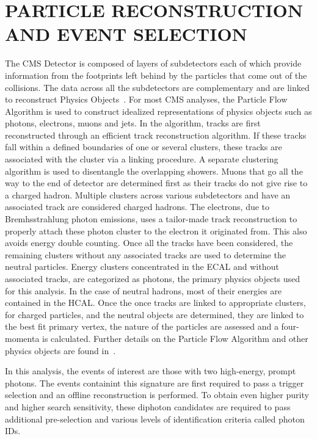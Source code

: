 \chapter{PARTICLE RECONSTRUCTION AND EVENT SELECTION}
\RaggedRight \parindent=25pt
The CMS Detector is composed of layers of subdetectors each of which provide information from the footprints left behind by the particles that come out of the collisions. The data across all the subdetectors are complementary and are linked to reconstruct Physics Objects~\cite{Beaudette:2013kbl}. For most CMS analyses, the Particle Flow Algorithm is used to construct idealized representations of physics objects such as photons, electrons, muons and jets. In the algorithm, tracks are first reconstructed through an efficient track reconstruction algorithm. If these tracks fall within a defined boundaries of one or several clusters, these tracks are associated with the cluster via a linking procedure. A separate clustering algorithm is used to disentangle the overlapping showers. Muons that go all the way to the end of detector are determined first as their tracks do not give rise to a charged hadron. Multiple clusters across various subdetectors and have an associated track are considered charged hadrons. The electrons, due to Bremhsstrahlung photon emissions, uses a tailor-made track reconstruction to properly attach these photon cluster to the electron it originated from. This also avoids energy double counting. Once all the tracks have been considered, the remaining clusters without any associated tracks are used to determine the neutral particles. Energy clusters concentrated in the ECAL and without associated tracks, are categorized as photons, the primary physics objects used for this analysis. In the case of neutral hadrons, most of their energies are contained in the HCAL. Once the once tracks are linked to appropriate clusters, for charged particles, and the neutral objects are determined, they are linked to the best fit primary vertex, the nature of the particles are assessed and a four-momenta is calculated. Further details on the Particle Flow Algorithm and other physics objects are found in~\cite{CMS-PRF-14-001}.

In this analysis, the events of interest are those with two high-energy, prompt photons. The events containint this signature are first required to pass a trigger selection and an offline reconstruction is performed. To obtain even higher purity and higher search sensitivity, these diphoton candidates are required to pass additional pre-selection and various levels of identification criteria called photon IDs. 


